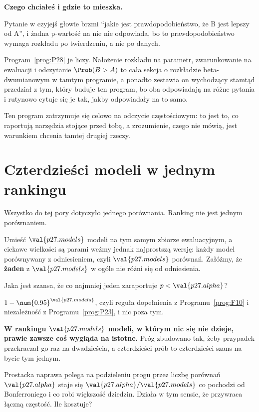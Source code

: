 \begin{fr}
\begin{rigourbox}
\textbf{Czego chciałeś i gdzie to mieszka.}

Pytanie w czyjejś głowie brzmi \enquote{jakie jest prawdopodobieństwo, że B
jest lepszy od A}, i żadna p-wartość na nie nie odpowiada, bo to
prawdopodobieństwo wymaga rozkładu po twierdzeniu, a nie po danych.

Program~\ref{prog:P28} je liczy. Nałożenie rozkładu na parametr, zwarunkowanie
na ewaluacji i odczytanie $\Prob(B > A)$ to cała sekcja o rozkładzie
beta-dwumianowym w tamtym programie, a ponadto zestawia on wychodzący stamtąd
przedział z tym, który buduje ten program, bo oba odpowiadają na różne pytania
i rutynowo cytuje się je tak, jakby odpowiadały na to samo.

Ten program zatrzymuje się celowo na odczycie częstościowym: to jest to, co
raportują narzędzia stojące przed tobą, a zrozumienie, czego nie mówią, jest
warunkiem chcenia tamtej drugiej rzeczy.
\end{rigourbox}
\end{fr}

\section{Czterdzieści modeli w jednym rankingu}
\label{sec:P27-many}

\begin{fr}
Wszystko do tej pory dotyczyło jednego porównania. Ranking nie jest jednym
porównaniem.

Umieść $\val{p27.models}$ modeli na tym samym zbiorze ewaluacyjnym, a ciekawe
wielkości są parami \dash{} weźmy jednak najprostszą wersję: każdy model
porównywany z odniesieniem, czyli $\val{p27.models}$ porównań. Załóżmy, że
\textbf{żaden} z $\val{p27.models}$ w ogóle nie różni się od odniesienia.

Jaka jest szansa, że co najmniej jeden zaraportuje
$p < \val{p27.alpha}$?
\dotline
\nextframe
\end{fr}

\begin{fr}

$1 - \num{0.95}^{\val{p27.models}}$, czyli reguła dopełnienia z
Programu~\ref{prog:F10} i niezależność z Programu~\ref{prog:P23}, i nic poza
tym.

\textbf{W rankingu $\val{p27.models}$ modeli, w którym nic się nie dzieje,
prawie zawsze coś wygląda na istotne.} Próg zbudowano tak, żeby przypadek
przekraczał go raz na dwadzieścia, a czterdzieści prób to czterdzieści szans
na bycie tym jednym.

Prostacka naprawa polega na podzieleniu progu przez liczbę porównań \dash{}
$\val{p27.alpha}$ staje się $\val{p27.alpha}/\val{p27.models}$ \dash{} co
pochodzi od Bonferroniego i co robi większość dziedzin. Działa w tym sensie, że
przywraca łączną częstość. Ile kosztuje?
\dotline
\nextframe
\end{fr}

